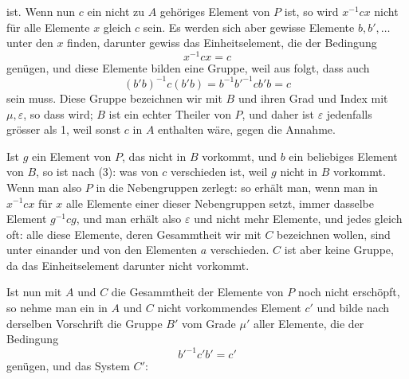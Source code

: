 ist. Wenn nun $c$ ein nicht zu $A$ gehöriges Element von $P$ ist, so wird $x^{-1}cx$ nicht für alle Elemente $x$ gleich $c$ sein. Es werden sich aber gewisse Elemente $b, b', \ldots$ unter den $x$ finden, darunter gewiss das Einheitselement, die der Bedingung
\[ x^{-1}cx = c \]
genügen, und diese Elemente bilden eine Gruppe, weil aus
folgt, dass auch
\[ (b'b)^{-1}c(b'b) = b^{-1}b'^{-1}cb'b = c \]
sein muss. Diese Gruppe bezeichnen wir mit $B$ und ihren Grad und Index mit $\mu, \varepsilon$, so dass
wird; $B$ ist ein echter Theiler von $P$, und daher ist $\varepsilon$ jedenfalls grösser als 1, weil sonst $c$ in $A$ enthalten wäre, gegen die Annahme.

Ist $g$ ein Element von $P$, das nicht in $B$ vorkommt, und $b$ ein beliebiges Element von $B$, so ist nach (3):
was von $c$ verschieden ist, weil $g$ nicht in $B$ vorkommt. Wenn man also $P$ in die Nebengruppen zerlegt:
so erhält man, wenn man in $x^{-1}cx$ für $x$ alle Elemente einer dieser Nebengruppen setzt, immer dasselbe Element $g^{-1}cg$, und man erhält also $\varepsilon$ und nicht mehr Elemente, und jedes gleich oft:
alle diese Elemente, deren Gesammtheit wir mit $C$ bezeichnen wollen, sind unter einander und von den Elementen $a$ verschieden. $C$ ist aber keine Gruppe, da das Einheitselement darunter nicht vorkommt.

Ist nun mit $A$ und $C$ die Gesammtheit der Elemente von $P$ noch nicht erschöpft, so nehme man ein in $A$ und $C$ nicht vorkommendes Element $c'$ und bilde nach derselben Vorschrift die Gruppe $B'$ vom Grade $\mu'$ aller Elemente, die der Bedingung
\[ b'^{-1}c'b' = c' \]
genügen, und das System $C'$:
